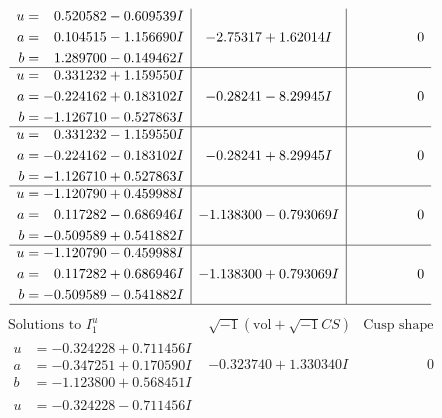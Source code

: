 \documentclass[1p]{elsarticle_modified}
\theoremstyle{definition}
\newcommand{\I}{\sqrt{-1}}
\begin{document}
$$\begin{array}{c|c|c}
\begin{aligned}
u &= \phantom{-}0.520582 - 0.609539 I \\
a &= \phantom{-}0.104515 - 1.156690 I \\
b &= \phantom{-}1.289700 - 0.149462 I\end{aligned}
 & -2.75317 + 1.62014 I & \phantom{-0.000000 } 0 \\ \hline\begin{aligned}
u &= \phantom{-}0.331232 + 1.159550 I \\
a &= -0.224162 + 0.183102 I \\
b &= -1.126710 - 0.527863 I\end{aligned}
 & -0.28241 - 8.29945 I & \phantom{-0.000000 } 0 \\ \hline\begin{aligned}
u &= \phantom{-}0.331232 - 1.159550 I \\
a &= -0.224162 - 0.183102 I \\
b &= -1.126710 + 0.527863 I\end{aligned}
 & -0.28241 + 8.29945 I & \phantom{-0.000000 } 0 \\ \hline\begin{aligned}
u &= -1.120790 + 0.459988 I \\
a &= \phantom{-}0.117282 - 0.686946 I \\
b &= -0.509589 + 0.541882 I\end{aligned}
 & -1.138300 - 0.793069 I & \phantom{-0.000000 } 0 \\ \hline\begin{aligned}
u &= -1.120790 - 0.459988 I \\
a &= \phantom{-}0.117282 + 0.686946 I \\
b &= -0.509589 - 0.541882 I\end{aligned}
 & -1.138300 + 0.793069 I & \phantom{-0.000000 } 0\\
 \hline 
 \end{array}$$\newpage$$\begin{array}{c|c|c}  
\text{Solutions to }I^u_{1}& \I (\text{vol} + \sqrt{-1}CS) & \text{Cusp shape}\\
 \hline 
\begin{aligned}
u &= -0.324228 + 0.711456 I \\
a &= -0.347251 + 0.170590 I \\
b &= -1.123800 + 0.568451 I\end{aligned}
 & -0.323740 + 1.330340 I & \phantom{-0.000000 } 0 \\ \hline\begin{aligned}
u &= -0.324228 - 0.711456 I \\

\end{aligned}
\end{array}$$
\end{document}
